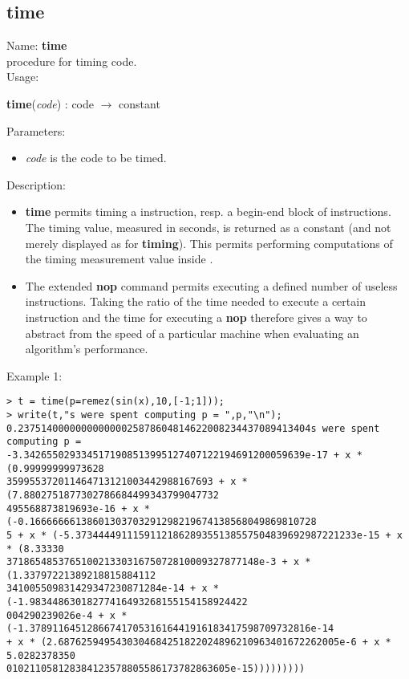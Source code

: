 \subsection{time}
\label{labtime}
\noindent Name: \textbf{time}\\
procedure for timing \sollya code.\\
\noindent Usage: 
\begin{center}
\textbf{time}(\emph{code}) : \textsf{code} $\rightarrow$ \textsf{constant}\\
\end{center}
Parameters: 
\begin{itemize}
\item \emph{code} is the code to be timed.
\end{itemize}
\noindent Description: \begin{itemize}

\item \textbf{time} permits timing a \sollya instruction, resp. a begin-end block
   of \sollya instructions. The timing value, measured in seconds, is returned
   as a \sollya constant (and not merely displayed as for \textbf{timing}). This 
   permits performing computations of the timing measurement value inside \sollya.

\item The extended \textbf{nop} command permits executing a defined number of
   useless instructions. Taking the ratio of the time needed to execute a
   certain \sollya instruction and the time for executing a \textbf{nop}
   therefore gives a way to abstract from the speed of a particular 
   machine when evaluating an algorithm's performance.
\end{itemize}
\noindent Example 1: 
\begin{center}\begin{minipage}{15cm}\begin{Verbatim}[frame=single]
> t = time(p=remez(sin(x),10,[-1;1]));
> write(t,"s were spent computing p = ",p,"\n");
0.237514000000000000025878604814622008234437089413404s were spent computing p = 
-3.3426550293345171908513995127407122194691200059639e-17 + x * (0.99999999973628
359955372011464713121003442988167693 + x * (7.8802751877302786684499343799047732
495568873819693e-16 + x * (-0.16666666138601303703291298219674138568049869810728
5 + x * (-5.3734444911159112186289355138557504839692987221233e-15 + x * (8.33330
37186548537651002133031675072810009327877148e-3 + x * (1.33797221389218815884112
341005509831429347230871284e-14 + x * (-1.98344863018277416493268155154158924422
004290239026e-4 + x * (-1.3789116451286674170531616441916183417598709732816e-14 
+ x * (2.6876259495430304684251822024896210963401672262005e-6 + x * 5.0282378350
010211058128384123578805586173782863605e-15)))))))))
\end{Verbatim}
\end{minipage}\end{center}
